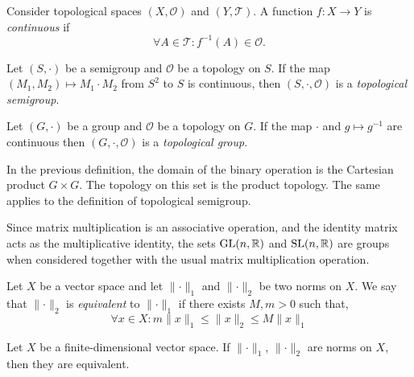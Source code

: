 \begin{definition}
	Consider topological spaces $(X, \mathcal{O})$ and $(Y, \mathcal{T})$. A function $f : X \to Y$ is \textit{continuous} if
	\[
	\forall A \in \mathcal{T} : f^{-1}(A) \in \mathcal{O}.
	\]
\end{definition}

\begin{definition}
	Let $(S, \cdot)$ be a semigroup and $\mathcal{O}$ be a topology on $S$. If the map $(M_1, M_2) \mapsto M_1 \cdot M_2$ from $S^2$ to $S$ is continuous, then $(S, \cdot, \mathcal{O})$ is a \textit{topological semigroup}.
\end{definition}

\begin{definition}
	Let $(G, \cdot)$ be a group and $\mathcal{O}$ be a topology on $G$. If the map $\cdot$ and $g \mapsto g^{-1}$ are continuous then $(G, \cdot, \mathcal{O} )$ is a \textit{topological group}.
\end{definition}

\begin{note}
	In the previous definition, the domain of the binary operation is the Cartesian product $G \times G$. The topology on this set is the product topology. The same applies to the definition of topological semigroup.
\end{note}

\begin{example}
	Since matrix multiplication is an associative operation, and the identity matrix acts as the multiplicative identity, the sets $\operatorname{GL}(n, \mathbb{R})$ and $\operatorname{SL}(n, \mathbb{R})$ are groups when considered together with the usual matrix multiplication operation.
\end{example}

\begin{definition}
	Let $X$ be a vector space and let $\lVert \cdot \rVert_1$ and $\lVert \cdot \rVert_2$ be two norms on $X$. We say that $\lVert \cdot \rVert_2$ is \textit{equivalent} to $\lVert \cdot \rVert_1$ if there exists $M, m > 0$ such that,
	\[
	\forall x \in X: m \lVert x \rVert_1 \leq \lVert x \rVert_2 \leq M \lVert x \rVert_1
	\]
\end{definition}

\begin{proposition}
	Let $X$ be a finite-dimensional vector space. If $\lVert \cdot \rVert_1$, $\lVert \cdot \rVert_2$ are norms on $X$, then they are equivalent.
\end{proposition}

